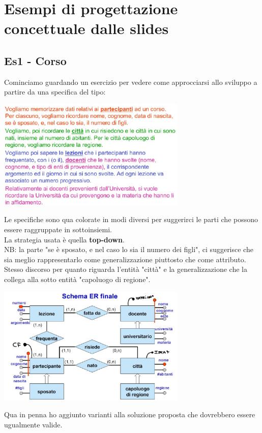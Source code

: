 \section{Esempi di progettazione concettuale dalle slides}
\subsection{Es1 - Corso}
Cominciamo guardando un esercizio per vedere come approcciarsi allo sviluppo a partire da una specifica del tipo:
\begin{center}
    \includegraphics[width=0.675\textwidth]{img/ER_es2corso_specifiche2.jpg}
\end{center}
Le specifiche sono qua colorate in modi diversi per suggerirci le parti che possono essere raggruppate in sottoinsiemi.
\\La strategia usata è quella \textbf{top-down}.
\\NB: la parte "se è sposato, e nel caso lo sia il numero dei figli", ci suggerisce che sia meglio rappresentarlo come generalizzazione piuttosto che come attributo. Stesso discorso per quanto riguarda l'entità "città" e la generalizzazione che la collega alla sotto entità "capoluogo di regione".
\begin{center}
    \includegraphics[width=0.675\textwidth]{img/ER_es2corso_soluzioni1.jpg}
\end{center}
Qua in penna ho aggiunto varianti alla soluzione proposta che dovrebbero essere ugualmente valide.

